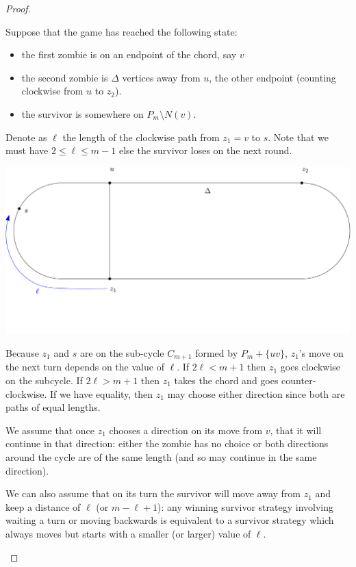 \documentclass[letterpaper, 10pt]{article}
\begin{document}
\begin{proof}
\begin{proofpart}
  Suppose that the game has reached the following state:
  \begin{itemize}
   \item the first zombie is on an endpoint of the chord, say $v$
   \item the second zombie is $\Delta$ vertices away from $u$, the other endpoint (counting clockwise from $u$ to $z_2$).
   \item the survivor is somewhere on $P_m \setminus N(v)$.
  \end{itemize}
  Denote as $\ell$ the length of the clockwise
  path from $z_1 = v$ to $s$. Note that we must have $2 \leq \ell \leq m-1$ else the survivor loses on the next round.
  \begin{center}
   \includegraphics[scale=0.20]{diagram1}
  \end{center}

  Because $z_1$ and $s$ are on the sub-cycle $C_{m+1}$ formed by
  $P_m + \{uv\}$, $z_1$'s move on the next turn depends on the
  value of $\ell$. If $2\ell < m+1$ then $z_1$ goes clockwise
  on the subcycle. If $2\ell > m+1$ then $z_1$ takes the chord and
  goes counter-clockwise.  If we have equality, then $z_1$ may
  choose either direction since both are paths of equal lengths.

  We assume that once $z_1$ chooses a direction on its move from $v$,
  that it will continue in that direction:
  either the zombie has no choice or both directions around
  the cycle are of the same length (and so
  may continue in the same direction).

  We can also assume that on its turn the survivor will move away from
  $z_1$ and keep a distance of $\ell$ (or $m-\ell +1$):
  any winning survivor strategy involving waiting a turn
  or moving backwards is equivalent to a survivor strategy which always moves but starts with a smaller (or larger) value of $\ell$.


\end{proofpart}
\end{proof}
\end{document}
